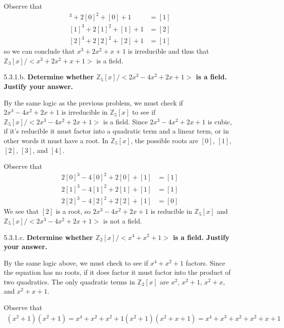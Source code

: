 \documentclass{article}
\begin{document}
\begin{enumerate}
			Observe that
			\begin{align*}
				[0]^3 + 2[0]^2 + [0] + 1 & = [1] \\
				[1]^3 + 2[1]^2 + [1] + 1 & = [2] \\
				[2]^3 + 2[2]^2 + [2] + 1 & = [1]
			\end{align*}
			so we can conclude that $x^3 + 2x^2 + x + 1$ is irreducible and thus that 
			$\mathbb{Z}_3[x]/<x^3 + 2x^2 + x + 1>$ is a field.
		
		\item [5.3.1.b. ] \textbf{Determine whether $\mathbb{Z}_5[x]/<2x^3 - 4x^2 + 2x + 1>$ is a 
			field. Justify your answer.}

			By the same logic as the previous problem, we must check if $2x^3 - 4x^2 + 2x + 1$ is
			irreducible in $\mathbb{Z}_5[x]$ to see if $\mathbb{Z}_5[x]/<2x^3 - 4x^2 + 2x + 1>$ is a 
			field. Since $2x^3 - 4x^2 + 2x + 1$ is cubic, if it's reducible it must factor into a 
			quadratic term and a linear term, or in other words it must have a root. In 
			$\mathbb{Z}_5[x]$, the possible roots are $[0]$, $[1]$, $[2]$, $[3]$, and $[4]$.

			Observe that
			\begin{align*}
				2[0]^3 - 4[0]^2 + 2[0] + [1] & = [1] \\
				2[1]^3 - 4[1]^2 + 2[1] + [1] & = [1] \\
				2[2]^3 - 4[2]^2 + 2[2] + [1] & = [0]
			\end{align*}
			We see that $[2]$ is a root, so $2x^3 - 4x^2 + 2x + 1$ is reducible in $\mathbb{Z}_5[x]$
			and $\mathbb{Z}_5[x]/<2x^3 - 4x^2 + 2x + 1>$ is not a field.
		
		\item [5.3.1.c. ] \textbf{Determine whether $\mathbb{Z}_2[x]/<x^4 + x^2 + 1>$ is a 
			field. Justify your answer.}

			By the same logic above, we must check to see if $x^4 + x^2 + 1$ factors. Since the 
			equation has no roots, if it does factor it must factor into the product of two 
			quadratics. The only quadratic terms in $\mathbb{Z}_2[x]$ are $x^2$, $x^2 + 1$, $x^2 + 
			x$, and $x^2 + x + 1$.

			Observe that
			\begin{align*}
				(x^2 + 1)(x^2 + 1) = x^4 + x^2 + x^2 + 1
				(x^2 + 1)(x^2 + x + 1) = x^4 + x^3 + x^2 + x^2 + x + 1
			\end{align*}


\end{enumerate}
\end{document}
